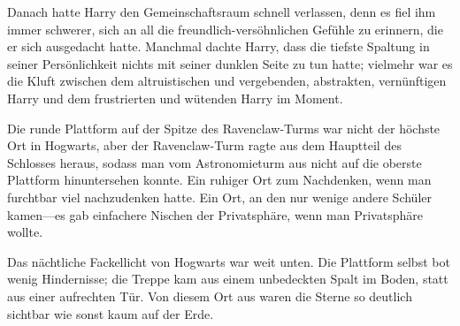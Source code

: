 Danach hatte Harry den Gemeinschaftsraum schnell verlassen, denn es fiel ihm immer schwerer, sich an all die freundlich-versöhnlichen Gefühle zu erinnern, die er sich ausgedacht hatte.
Manchmal dachte Harry, dass die tiefste Spaltung in seiner Persönlichkeit nichts mit seiner dunklen Seite zu tun hatte; vielmehr war es die Kluft zwischen dem altruistischen und vergebenden, abstrakten, vernünftigen Harry und dem frustrierten und wütenden Harry im Moment.

Die runde Plattform auf der Spitze des Ravenclaw-Turms war nicht der höchste Ort in Hogwarts, aber der Ravenclaw-Turm ragte aus dem Hauptteil des Schlosses heraus, sodass man vom Astronomieturm aus nicht auf die oberste Plattform hinuntersehen konnte. Ein ruhiger Ort zum Nachdenken, wenn man furchtbar viel nachzudenken hatte. Ein Ort, an den nur wenige andere Schüler kamen—es gab einfachere Nischen der Privatsphäre, wenn man Privatsphäre wollte.

Das nächtliche Fackellicht von Hogwarts war weit unten. Die Plattform selbst bot wenig Hindernisse; die Treppe kam aus einem unbedeckten Spalt im Boden, statt aus einer aufrechten Tür. Von diesem Ort aus waren die Sterne so deutlich sichtbar wie sonst kaum auf der Erde.

